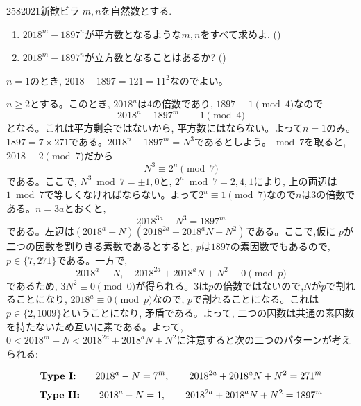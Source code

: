 \begin{prob}{258}{}{2021新歓ビラ}
$m,n$を自然数とする. 
\begin{enumerate}
\item $2018^{m} - 1897^{n}$が平方数となるような$m,n$をすべて求めよ. ()
\item $2018^{m} - 1897^{n}$が立方数となることはあるか? ()
\end{enumerate}
\end{prob}
$n=1$のとき, $2018 - 1897 = 121 = 11^2$なのでよい。\par 
$n\geq 2$とする。このとき, $2018^{n}$は$4$の倍数であり, $1897\equiv 1\pmod{4}$なので
\[2018^{n} - 1897^{m} \equiv -1\pmod{4}\]
となる。これは平方剰余ではないから, 平方数にはならない。よって$n=1$のみ。
$1897 = 7\times 271$である。$2018^{n} - 1897^{m} = N^3$であるとしよう。$\bmod{7}$を取ると, $2018 \equiv 2\pmod{7}$だから
\[N^3 \equiv 2^{n}\pmod{7}\]
である。ここで, $N^3\bmod{7}  = \pm 1, 0$と, $2^{n} \bmod{7} = 2,4,1$により, 上の両辺は$1\bmod{7}$で等しくなければならない。よって$2^{n} \equiv  1\pmod{7}$なので$n$は$3$の倍数である。$n=3a$とおくと, 
\[2018^{3a} - N^3 = 1897^{m}\]
である。左辺は$(2018^a - N)(2018^{2a} + 2018^{a}N + N^2)$である。ここで,仮に $p$が二つの因数を割りきる素数であるとすると, $p$は$1897$の素因数でもあるので, $p\in \{ 7,271\}$である。一方で, 
\[2018^{a} \equiv N,\quad 2018^{2a} + 2018^{a}N + N^2 \equiv 0\pmod{p}\]
であるため, $3N^2 \equiv 0\pmod{0}$が得られる。$3$は$p$の倍数ではないので,$N$が$p$で割れることになり, $2018^{a} \equiv 0\pmod{p}$なので, $p$で割れることになる。これは$p\in \{ 2,1009 \}$ということになり, 矛盾である。よって, 二つの因数は共通の素因数を持たないため互いに素である。よって, $0 < 2018^{m} - N < 2018^{2a} + 2018^{a}N + N^2$に注意すると次の二つのパターンが考えられる:
\begin{screen} 
\[\text{\textbf{Type I:}}\qquad 2018^{a} - N = 7^{m},\qquad 2018^{2a} + 2018^{a}N + N^2 = 271^{m}\]
\[\text{\textbf{Type II:}}\qquad 2018^{a} - N = 1,\qquad 2018^{2a} + 2018^{a}N + N^2 = 1897^{m}\]
\end{screen}
